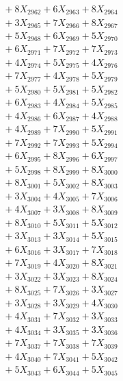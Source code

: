 \documentclass[a4paper,10pt]{article}
\begin{document}
{\begin{align}
&\;  + 8 X_{2962} + 6 X_{2963} + 8 X_{2964} \\[0.3ex]
&\;  + 3 X_{2965} + 7 X_{2966} + 8 X_{2967} \\[0.3ex]
&\;  + 5 X_{2968} + 6 X_{2969} + 5 X_{2970} \\[0.3ex]
&\;  + 6 X_{2971} + 7 X_{2972} + 7 X_{2973} \\[0.3ex]
&\;  + 4 X_{2974} + 5 X_{2975} + 4 X_{2976} \\[0.3ex]
&\;  + 7 X_{2977} + 4 X_{2978} + 5 X_{2979} \\[0.5ex]\allowbreak
&\;  + 5 X_{2980} + 5 X_{2981} + 5 X_{2982} \\[0.3ex]
&\;  + 6 X_{2983} + 4 X_{2984} + 5 X_{2985} \\[0.3ex]
&\;  + 4 X_{2986} + 6 X_{2987} + 4 X_{2988} \\[0.3ex]
&\;  + 4 X_{2989} + 7 X_{2990} + 5 X_{2991} \\[0.3ex]
&\;  + 7 X_{2992} + 7 X_{2993} + 5 X_{2994} \\[0.3ex]
&\;  + 6 X_{2995} + 8 X_{2996} + 6 X_{2997} \\[0.3ex]
&\;  + 5 X_{2998} + 8 X_{2999} + 8 X_{3000} \\[0.3ex]
&\;  + 8 X_{3001} + 5 X_{3002} + 8 X_{3003} \\[0.3ex]
&\;  + 3 X_{3004} + 4 X_{3005} + 7 X_{3006} \\[0.3ex]
&\;  + 4 X_{3007} + 3 X_{3008} + 8 X_{3009} \\[0.5ex]\allowbreak
&\;  + 8 X_{3010} + 5 X_{3011} + 5 X_{3012} \\[0.3ex]
&\;  + 3 X_{3013} + 3 X_{3014} + 5 X_{3015} \\[0.3ex]
&\;  + 6 X_{3016} + 3 X_{3017} + 7 X_{3018} \\[0.3ex]
&\;  + 7 X_{3019} + 4 X_{3020} + 8 X_{3021} \\[0.3ex]
&\;  + 3 X_{3022} + 3 X_{3023} + 8 X_{3024} \\[0.3ex]
&\;  + 8 X_{3025} + 7 X_{3026} + 3 X_{3027} \\[0.3ex]
&\;  + 3 X_{3028} + 3 X_{3029} + 4 X_{3030} \\[0.3ex]
&\;  + 4 X_{3031} + 7 X_{3032} + 3 X_{3033} \\[0.3ex]
&\;  + 4 X_{3034} + 3 X_{3035} + 3 X_{3036} \\[0.3ex]
&\;  + 7 X_{3037} + 7 X_{3038} + 7 X_{3039} \\[0.5ex]\allowbreak
&\;  + 4 X_{3040} + 7 X_{3041} + 5 X_{3042} \\[0.3ex]
&\;  + 5 X_{3043} + 6 X_{3044} + 5 X_{3045} \\[0.3ex]

\end{align}}
\end{document}
